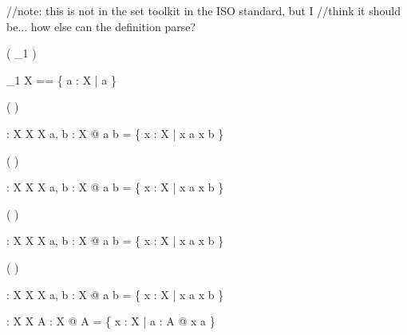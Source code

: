 //note: this is not in the set toolkit in the ISO standard, but I
//think it should be... how else can the definition parse?
\begin{zed}
   ( \power_1 \varg )
\end{zed}

\begin{zed}
  \power_1 X == \{ a : \power X | a \neq \emptyset \}
\end{zed}

\begin{zed}
   \leftassoc ( \varg \cup \varg )
\end{zed}

\begin{gendef}[X]
  \varg \cup \varg : \power X \cross \power X \fun \power X
\where
  \forall a, b : \power X @ a \cup b = \{ x : X | x \in a \lor x \in
  b \}
\end{gendef}

\begin{zed}
   \leftassoc ( \varg \cap \varg )
\end{zed}

\begin{gendef}[X]
  \varg \cap \varg : \power X \cross \power X \fun \power X
\where
  \forall a, b : \power X @ a \cap b = \{ x : X | x \in a \land x \in
  b \}
\end{gendef}


\begin{zed}
   \leftassoc ( \varg \setminus \varg )
\end{zed}

\begin{gendef}[X]
  \varg \setminus \varg : \power X \cross \power X \fun \power X
\where
  \forall a, b : \power X @ a \setminus b = \{ x : X | x \in a \land x \notin
  b \}
\end{gendef}

\begin{zed}
   \leftassoc ( \varg \symdiff \varg )
\end{zed}

\begin{gendef}[X]
  \varg \symdiff \varg : \power X \cross \power X \fun \power X
\where
  \forall a, b : \power X @ a \symdiff b = \{ x : X | \lnot x \in a
  \iff x \notin
  b \}
\end{gendef}

\begin{gendef}[X]
  \bigcup : \power \power X \fun \power X
\where
  \forall A : \power \power X @ \bigcup A = \{ x : X | \exists a : A @ x \in a \}
\end{gendef}


